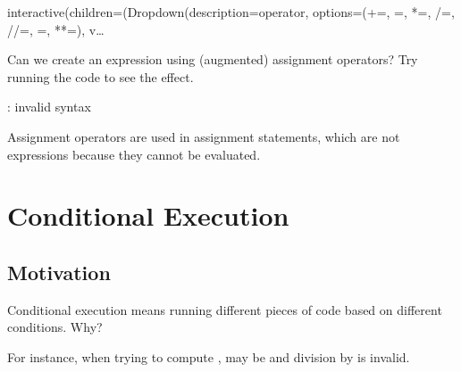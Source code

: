 \documentclass[letterpaper,10pt,english]{sphinxmanual}
\begin{document}
\begin{sphinxVerbatim}[commandchars=\\\{\}]
interactive(children=(Dropdown(description=\PYGZsq{}operator\PYGZsq{}, options=(\PYGZsq{}+=\PYGZsq{}, \PYGZsq{}\PYGZhy{}=\PYGZsq{}, \PYGZsq{}*=\PYGZsq{}, \PYGZsq{}/=\PYGZsq{}, \PYGZsq{}//=\PYGZsq{}, \PYGZsq{}\PYGZpc{}=\PYGZsq{}, \PYGZsq{}**=\PYGZsq{}), v…
\end{sphinxVerbatim}

 Can we create an expression using (augmented) assignment operators? Try running the code to see the effect.

\begin{sphinxVerbatim}[commandchars=\\\{\}]
  
\end{sphinxVerbatim}

\begin{sphinxVerbatim}[commandchars=\\\{\}]
  
: invalid syntax
\end{sphinxVerbatim}

Assignment operators are used in assignment statements, which are not expressions because they cannot be evaluated.


\chapter{Conditional Execution}
\label{\detokenize{Lecture3/Conditional Execution:conditional-execution}}\label{\detokenize{Lecture3/Conditional Execution::doc}}

\section{Motivation}
\label{\detokenize{Lecture3/Conditional Execution:motivation}}
Conditional execution means running different pieces of code based on different conditions. Why?

For instance, when trying to compute ,  may be  and division by  is invalid.
\end{document}
